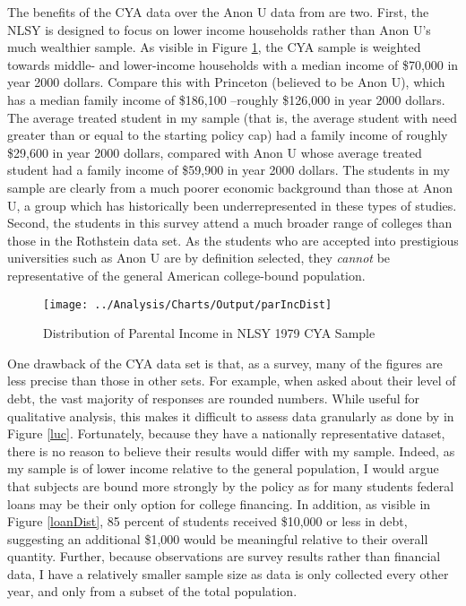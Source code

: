 \documentclass[12pt]{article}
\begin{document}
	The benefits of the CYA data over the Anon U data from \textcite{rothstein2011} are two. First, the NLSY is designed to focus on lower income households rather than Anon U's much wealthier sample. As visible in Figure \ref{incDist}, the CYA sample is weighted towards middle- and lower-income households with a median income of \$70,000 in year 2000 dollars. Compare this with Princeton (believed to be Anon U), which has a median family income of \$186,100 \parencite{aisch2017}--roughly \$126,000 in year 2000 dollars. The average treated student in my sample (that is, the average student with need greater than or equal to the starting policy cap) had a family income of roughly \$29,600 in year 2000 dollars, compared with Anon U whose average treated student had a family income of \$59,900 in year 2000 dollars. The students in my sample are clearly from a much poorer economic background than those at Anon U, a group which has historically been underrepresented in these types of studies. Second, the students in this survey attend a much broader range of colleges than those in the Rothstein data set. As the students who are accepted into prestigious universities such as Anon U are by definition selected, they \emph{cannot} be representative of the general American college-bound population. 
	
	\begin{figure}
		\centering
		\caption{Distribution of Parental Income in NLSY 1979 CYA Sample}
		\label{incDist}
		\texttt{[image: ../Analysis/Charts/Output/parIncDist]}
	\end{figure}
	
	One drawback of the CYA data set is that, as a survey, many of the figures are less precise than those in other sets. For example, when asked about their level of debt, the vast majority of responses are rounded numbers. While useful for qualitative analysis, this makes it difficult to assess data granularly as done by \textcite{lucca2018} in Figure \ref{luc}. Fortunately, because they have a nationally representative dataset, there is no reason to believe their results would differ with my sample. Indeed, as my sample is of lower income relative to the general population, I would argue that subjects are bound more strongly by the policy as for many students federal loans may be their only option for college financing. In addition, as visible in Figure \ref{loanDist}, 85 percent of students received \$10,000 or less in debt, suggesting an additional \$1,000 would be meaningful relative to their overall quantity. Further, because observations are survey results rather than financial data, I have a relatively smaller sample size as data is only collected every other year, and only from a subset of the total population.
	
\end{document}
